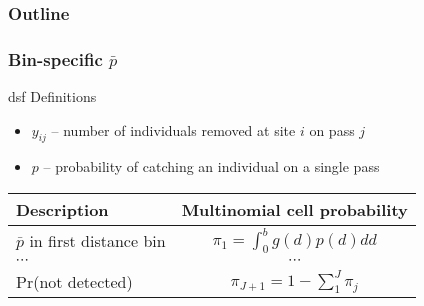 \documentclass[color=usenames,dvipsnames]{beamer}\usepackage[]{graphicx}\usepackage[]{color}
\begin{document}
\begin{frame}
  \frametitle{Outline}
  \Large
  \tableofcontents[currentsection]
\end{frame}



\begin{frame}
  \frametitle{Bin-specific $\bar{p}$}
  \small
  dsf
  \pause
  \vfill
  Definitions
  \begin{itemize}
    \setlength\itemsep{1pt}
    \item $y_{ij}$ -- number of individuals removed at site $i$ on pass $j$
    \item $p$ -- probability of catching an individual on a single pass
  \end{itemize}
  \pause \vfill
  \footnotesize
  \begin{tabular}{lc}
    \hline
    \centering
    Description                       & Multinomial cell probability \\
    \hline
    $\bar{p}$ in first distance bin  & $\pi_1 = \int_0^b g(d)p(d) dd$                  \\
    {\centering $\cdots$}             & $\cdots$                     \\
    Pr(not detected)                  & $\pi_{J+1} = 1-\sum_1^J \pi_j$          \\
    \hline
  \end{tabular}
\end{frame}
\end{document}
